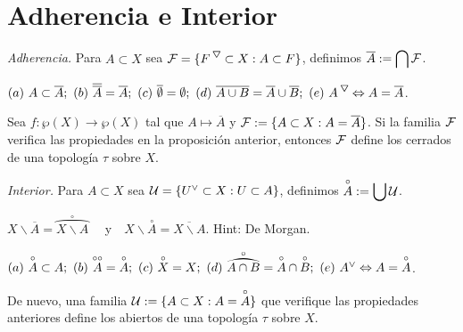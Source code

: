 \section*{Adherencia e Interior}

\begin{definition}
    \emph{Adherencia.} Para \(A\subset X\) sea \(\F = \{ F^\ce\subset X : A\subset F\}\), definimos \(\displaystyle \overline{A} := \bigcap \mathcal{F}\). 
\end{definition}
\begin{proposition}
    \((a) \ A\subset \overline{A};  \ (b) \ \overline{\overline{A}} = \overline{A}; \ (c)\ \overline{\emptyset}=\emptyset;  \ (d)\ \overline{A\cup B} = \overline{A}\cup \overline{B};  \ (e) \ A^\ce \Leftrightarrow A = \overline{A}\). 
\end{proposition}
\begin{note}
    Sea \(f:\wp(X)\to\wp(X)\) tal que \(A\mapsto \overline{A}\) y \(\mathcal{F} := \{A\subset X: A = \overline{A}\}\). Si la familia \(\mathcal{F}\) verifica las propiedades en la proposición anterior, entonces \(\mathcal{F}\) define los cerrados de una topología \(\tau\) sobre \(X\). 
\end{note}
\begin{definition}
    \emph{Interior.} Para \(A\subset X\) sea \(\U=\{U^\ab\subset X: U \subset A\}\), definimos \(\displaystyle \overset{\circ}{A} := \bigcup \mathcal{U}\).  
\end{definition}
\begin{proposition}
    \(X\backslash \overline{A} = \overset{\circ}{\wideparen{X\backslash A}}\) \ \ y\ \ \(X\backslash \overset{\circ}{A}= \overline{X\backslash A}\). Hint: De Morgan.  
\end{proposition}
\begin{proposition}
    \((a) \ \overset{\circ}{A}\subset A; \  (b) \ \overset{\circ\circ}{A} = \overset{\circ}{A}; \ (c)\ \overset{\circ}{X}=X; \ (d)\ \overset{\circ}{\wideparen{A\cap B}} = \overset{\circ}{A}\cap \overset{\circ}{B}; \  (e) \ A^\ab \Leftrightarrow A = \overset{\circ}{A}\). 
\end{proposition}
\begin{note}
    De nuevo, una familia \(\mathcal{U} := \{A\subset X: A = \overset{\circ}{A}\}\) que verifique las propiedades anteriores define los abiertos de una topología \(\tau\) sobre \(X\). 
\end{note}